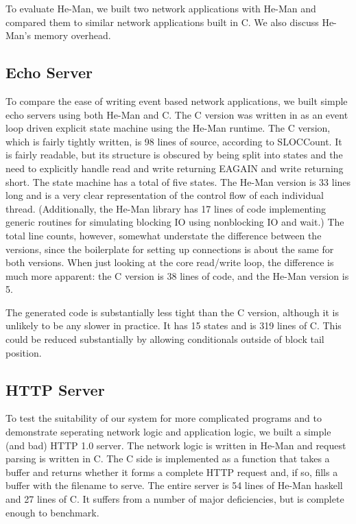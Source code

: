 \documentclass[preprint,11pt]{sigplanconf}
\begin{document}
To evaluate He-Man, we built two network applications with He-Man and
compared them to similar network applications built in C.
We also discuss He-Man's memory overhead.

\subsection{Echo Server}

To compare the ease of writing event based network applications, we
built simple echo servers using both He-Man and C. The C version was
written in as an event loop driven explicit state machine using the
He-Man runtime. The C version, which is fairly tightly written, is 98
lines of source, according to SLOCCount. It is fairly readable, but
its structure is obscured by being split into states and the need to
explicitly handle read and write returning EAGAIN and write returning
short. The state machine has a total of five states. The He-Man
version is 33 lines long and is a very clear representation of the
control flow of each individual thread. (Additionally, the He-Man
library has 17 lines of code implementing generic routines for
simulating blocking IO using nonblocking IO and wait.) The total line
counts, however, somewhat understate the difference between the
versions, since the boilerplate for setting up connections is about
the same for both versions. When just looking at the core read/write
loop, the difference is much more apparent: the C version is 38 lines
of code, and the He-Man version is 5.

The generated code is substantially less tight than the C version,
although it is unlikely to be any slower in practice. It has 15 states
and is 319 lines of C. This could be reduced substantially by allowing
conditionals outside of block tail position.

\subsection{HTTP Server}

To test the suitability of our system for more complicated programs
and to demonstrate seperating network logic and application logic, we
built a simple (and bad) HTTP 1.0 server. The network logic is written
in He-Man and request parsing is written in C. The C side is
implemented as a function that takes a buffer and returns whether it
forms a complete HTTP request and, if so, fills a buffer with the
filename to serve. The entire server is 54 lines of He-Man haskell and
27 lines of C. It suffers from a number of major deficiencies, but is
complete enough to benchmark.
\end{document}
